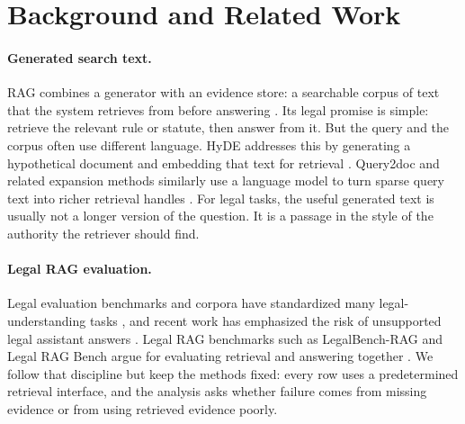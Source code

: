 \section{Background and Related Work}\label{sec:preliminary}

\paragraph{Generated search text.}
RAG combines a generator with an evidence store: a searchable corpus of
text that the system retrieves from before answering \citep{lewis2020rag}.
Its legal promise is simple: retrieve the relevant rule or statute, then
answer from it. But the query and the corpus often use different language. HyDE
addresses this by generating a hypothetical document and embedding that text
for retrieval \citep{gao2023hyde}. Query2doc and related expansion methods
similarly use a language model to turn sparse query text into richer retrieval
handles \citep{wang2023query2doc}. For legal tasks, the useful generated text
is usually not a longer version of the question. It is a passage in the style
of the authority the retriever should find.

\paragraph{Legal RAG evaluation.}
Legal evaluation benchmarks and corpora have standardized many
legal-understanding tasks
\citep{guha2023legalbench,chalkidis2022lexglue,henderson2022pileoflaw}, and
recent work has emphasized the risk of unsupported legal assistant answers
\citep{magesh2024hallucinations}. Legal RAG benchmarks such as LegalBench-RAG
and Legal RAG Bench argue for evaluating retrieval and answering together
\citep{pipitone2024legalbenchrag,butler2026legalragbench}. We follow that
discipline but keep the methods fixed: every row uses a predetermined retrieval
interface, and the analysis asks whether failure comes from missing evidence or
from using retrieved evidence poorly.
